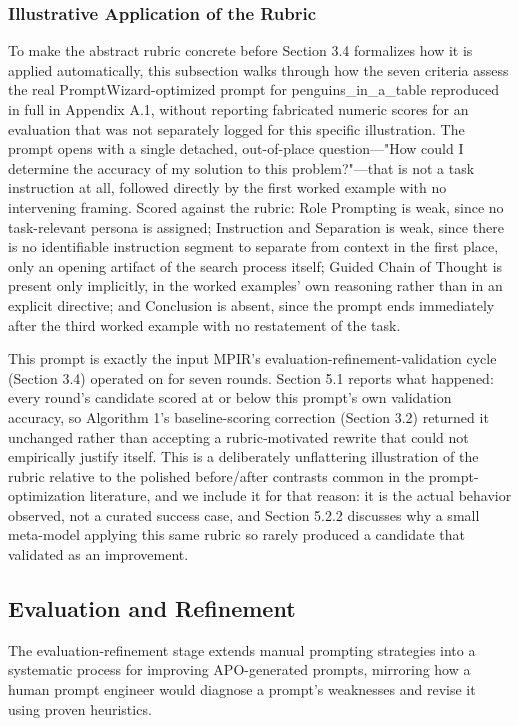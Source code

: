 \documentclass[a4paper,fleqn]{cas-sc}
\begin{document}
\subsubsection{Illustrative Application of the Rubric}

To make the abstract rubric concrete before Section 3.4 formalizes how it is applied automatically, this subsection walks through how the seven criteria assess the real PromptWizard-optimized prompt for penguins\_\allowbreak{}in\_\allowbreak{}a\_\allowbreak{}table reproduced in full in Appendix A.1, without reporting fabricated numeric scores for an evaluation that was not separately logged for this specific illustration. The prompt opens with a single detached, out-of-place question---"How could I determine the accuracy of my solution to this problem?"---that is not a task instruction at all, followed directly by the first worked example with no intervening framing. Scored against the rubric: Role Prompting is weak, since no task-relevant persona is assigned; Instruction and Separation is weak, since there is no identifiable instruction segment to separate from context in the first place, only an opening artifact of the search process itself; Guided Chain of Thought is present only implicitly, in the worked examples' own reasoning rather than in an explicit directive; and Conclusion is absent, since the prompt ends immediately after the third worked example with no restatement of the task.

This prompt is exactly the input MPIR's evaluation-refinement-validation cycle (Section 3.4) operated on for seven rounds. Section 5.1 reports what happened: every round's candidate scored at or below this prompt's own validation accuracy, so Algorithm 1's baseline-scoring correction (Section 3.2) returned it unchanged rather than accepting a rubric-motivated rewrite that could not empirically justify itself. This is a deliberately unflattering illustration of the rubric relative to the polished before/after contrasts common in the prompt-optimization literature, and we include it for that reason: it is the actual behavior observed, not a curated success case, and Section 5.2.2 discusses why a small meta-model applying this same rubric so rarely produced a candidate that validated as an improvement.

\subsection{Evaluation and Refinement}

The evaluation-refinement stage extends manual prompting strategies into a systematic process for improving APO-generated prompts, mirroring how a human prompt engineer would diagnose a prompt's weaknesses and revise it using proven heuristics.
\end{document}
